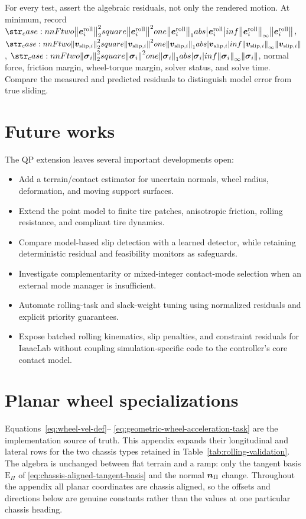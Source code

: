 \documentclass[10pt]{article}
\newcommand{\slipVelocity}[1]{\contactVel_{\text{slip},#1}}
\newcommand{\rollingResidual}{\bs{e}^{\text{roll}}}
\newcommand{\slackVariable}{\bs{\sigma}}
\begin{document}
For every test, assert the algebraic residuals, not only the rendered motion.
At minimum, record $\norm{\rollingResidual_i}$,
$\norm{\slipVelocity{i}}$, $\norm{\slackVariable_i}$, normal force, friction
margin, wheel-torque margin, solver status, and solve time. Compare the
measured and predicted residuals to distinguish model error from true sliding.

\section{Future works}

The QP extension leaves several important developments open:
\begin{itemize}
  \item Add a terrain/contact estimator for uncertain normals, wheel radius,
    deformation, and moving support surfaces.
  \item Extend the point model to finite tire patches, anisotropic friction,
    rolling resistance, and compliant tire dynamics.
  \item Compare model-based slip detection with a learned detector, while
    retaining deterministic residual and feasibility monitors as safeguards.
  \item Investigate complementarity or mixed-integer contact-mode selection
    when an external mode manager is insufficient.
  \item Automate rolling-task and slack-weight tuning using normalized residuals
    and explicit priority guarantees.
  \item Expose batched rolling kinematics, slip penalties, and constraint
    residuals for IsaacLab without coupling simulation-specific code to the
    controller's core contact model.
\end{itemize}




\appendix
\section{Planar wheel specializations}
\label{app:rolling-specializations}

Equations~\eqref{eq:wheel-vel-def}--
\eqref{eq:geometric-wheel-acceleration-task} are the implementation source of
truth. This appendix expands their longitudinal and lateral rows for the two
chassis types retained in Table~\ref{tab:rolling-validation}. The algebra is
unchanged between flat terrain and a ramp: only the tangent basis
$\text{E}_{\Pi}$ of \eqref{eq:chassis-aligned-tangent-basis} and the normal
$\boldsymbol{n}_{\Pi}$ change. Throughout the appendix all planar coordinates
are chassis aligned, so the offsets and directions below are genuine constants
rather than the values at one particular chassis heading.
\end{document}
